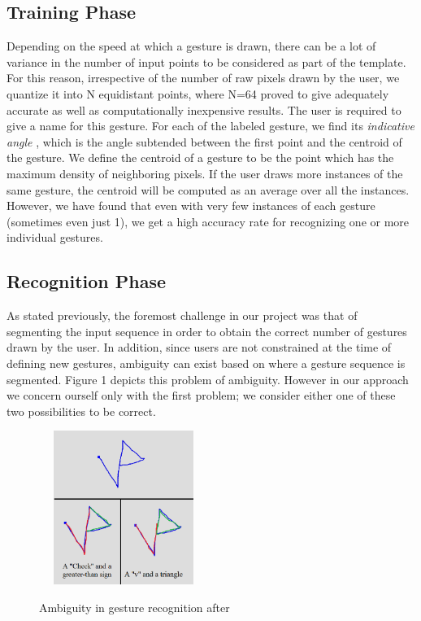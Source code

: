 \documentclass[twoside]{article}
\begin{document}
\begin{multicols}{2}
\subsection*{Training Phase}

Depending on the speed at which a gesture is drawn, there can be a lot of variance in the number of input points to be considered as part of the template. For this reason, irrespective of the number of raw pixels drawn by the user, we quantize it into N equidistant points, where N=64 proved to give adequately accurate as well as computationally inexpensive results. The user is required to give a name for this gesture. For each of the labeled gesture, we find its \textit{indicative angle} \cite{wobbrock2007gestures}, which is the angle subtended between the first point and the centroid of the gesture. We define the centroid of a gesture to be the point which has the maximum density of neighboring pixels. If the user draws more instances of the same gesture, the centroid will be computed as an average over all the instances. However, we have found that even with very few instances of each gesture (sometimes even just 1), we get a high accuracy rate for recognizing one or more individual gestures. 

\subsection*{Recognition Phase}
As stated previously, the foremost challenge in our project was that of segmenting the input sequence in order to obtain the correct number of gestures drawn by the user. In addition, since users are not constrained at the time of defining new gestures, ambiguity can exist based on where a gesture sequence is segmented. Figure 1 depicts this problem of ambiguity. However in our approach we concern ourself only with the first problem; we consider either one of these two possibilities to be correct.

\begin{figure}[H]
	\centering
	\includegraphics[height=5cm, width=5.5cm]{Images/Ambiguity1.png}
	\label{fig1}
	\caption{Ambiguity in gesture recognition after}
\end{figure}


\end{multicols}
\end{document}
